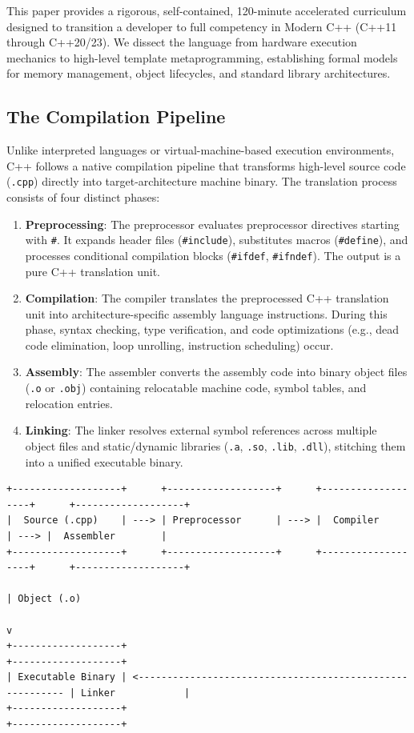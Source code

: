 \documentclass[10pt,journal,compsoc,onecolumn]{IEEEtran}
\begin{document}
This paper provides a rigorous, self-contained, 120-minute accelerated curriculum designed to transition a developer to full competency in Modern C++ (C++11 through C++20/23). We dissect the language from hardware execution mechanics to high-level template metaprogramming, establishing formal models for memory management, object lifecycles, and standard library architectures.

\subsection{The Compilation Pipeline}
Unlike interpreted languages or virtual-machine-based execution environments, C++ follows a native compilation pipeline that transforms high-level source code (\texttt{.cpp}) directly into target-architecture machine binary. The translation process consists of four distinct phases:

\begin{enumerate}
    \item \textbf{Preprocessing}: The preprocessor evaluates preprocessor directives starting with \texttt{\#}. It expands header files (\texttt{\#include}), substitutes macros (\texttt{\#define}), and processes conditional compilation blocks (\texttt{\#ifdef}, \texttt{\#ifndef}). The output is a pure C++ translation unit.
    \item \textbf{Compilation}: The compiler translates the preprocessed C++ translation unit into architecture-specific assembly language instructions. During this phase, syntax checking, type verification, and code optimizations (e.g., dead code elimination, loop unrolling, instruction scheduling) occur.
    \item \textbf{Assembly}: The assembler converts the assembly code into binary object files (\texttt{.o} or \texttt{.obj}) containing relocatable machine code, symbol tables, and relocation entries.
    \item \textbf{Linking}: The linker resolves external symbol references across multiple object files and static/dynamic libraries (\texttt{.a}, \texttt{.so}, \texttt{.lib}, \texttt{.dll}), stitching them into a unified executable binary.
\end{enumerate}

\begin{verbatim}
+-------------------+      +-------------------+      +-------------------+      +-------------------+
|  Source (.cpp)    | ---> | Preprocessor      | ---> |  Compiler         | ---> |  Assembler        |
+-------------------+      +-------------------+      +-------------------+      +-------------------+
                                                                                       | Object (.o)
                                                                                       v
+-------------------+                                                            +-------------------+
| Executable Binary | <--------------------------------------------------------- | Linker            |
+-------------------+                                                            +-------------------+
\end{verbatim}
\end{document}
